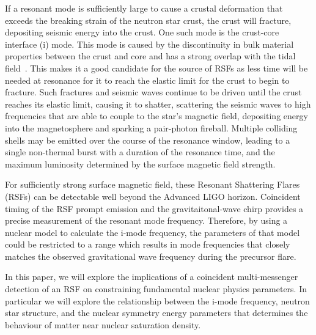 \documentclass[fleqn,usenatbib]{mnras}
\begin{document}
\hspace{\parindent}If a resonant mode is sufficiently large to cause a crustal deformation that exceeds the breaking strain of the neutron star crust, the crust will fracture, depositing seismic energy into the crust. One such mode is the crust-core interface (i) mode. This mode is caused by the discontinuity in bulk material properties between the crust and core and has a strong overlap with the tidal field~\citet{tsang2012resonant}. This makes it a good candidate for the source of RSFs as less time will be needed at resonance for it to reach the elastic limit for the crust to begin to fracture. Such fractures and seismic waves continue to be driven until the crust reaches its elastic limit, causing it to shatter, scattering the seismic waves to high frequencies that are able to couple to the star's magnetic field, depositing energy into the magnetosphere and sparking a pair-photon fireball. Multiple colliding shells may be emitted over the course of the resonance window, leading to a single non-thermal burst with a duration of the resonance time, and the maximum luminosity determined by the surface magnetic field strength. %

\hspace{\parindent}For sufficiently strong surface magnetic field, these Resonant Shattering Flares (RSFs) can be detectable well beyond the Advanced LIGO horizon. Coincident timing of the RSF prompt emission and the gravitaitonal-wave chirp provides a precise measurement of the resonant mode frequency. Therefore, by using a nuclear model to calculate the i-mode frequency, the parameters of that model could be restricted to a range which results in mode frequencies that closely matches the observed gravitational wave frequency during the precursor flare. 

\hspace{\parindent}In this paper, we will explore the implications of a coincident multi-messenger detection of an RSF on constraining fundamental nuclear physics parameters. In particular we will explore the relationship between the i-mode frequency, neutron star structure, and the nuclear symmetry energy parameters that determines the behaviour of matter near nuclear saturation density. 
\end{document}
